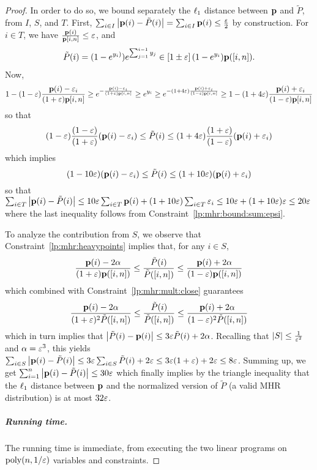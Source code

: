 \begin{proof}
In order to do so, we bound separately the $\lp[1]$ distance between $\D$ and $\tilde{P}$, from $I$, $S$, and $T$. 
First, $\sum_{i\in I} \abs{\D(i) - \tilde{P}(i)}  = \sum_{i\in I} \D(i) \leq \frac{\eps}{2}$ by construction.
For $i\in T$, we have $\frac{\D(i)}{\D[i,n]} \leq \eps$, and
\begin{align*}
  \tilde{P}(i) = (1-e^{y_i)}) e^{\sum_{j=1}^{i-1} y_j} \in \left[1\pm \eps\right] (1-e^{y_i}) \D([i,n]).
\end{align*}
Now,
\begin{align*}
  1-(1-\eps)\frac{\D(i)-\eps_i}{(1+\eps)\D[i,n]} \geq e^{-\frac{\D(i)-\eps_i}{(1+\eps)\D[i,n]}} 
  \geq e^{y_i} 
  \geq e^{-(1+4\eps)\frac{\D(i)+\eps_i}{(1-\eps)\D[i,n]}} 
  \geq 1-(1+4\eps)\frac{\D(i)+\eps_i}{(1-\eps)\D[i,n]}
\end{align*}
so that
\[
  (1-\eps)\frac{(1-\eps)}{(1+\eps)}(\D(i)-\eps_i)
  \leq
  \tilde{P}(i) 
  \leq
  (1+4\eps)\frac{(1+\eps)}{(1-\eps)}(\D(i)+\eps_i)
\]
which implies
\[
  (1-10\eps)(\D(i)-\eps_i)
  \leq
  \tilde{P}(i) 
  \leq
  (1+10\eps)(\D(i)+\eps_i)
\]
so that $\sum_{i\in T} \abs{\D(i) - \tilde{P}(i)} \leq 10\eps \sum_{i\in T} \D(i) + (1+10\eps)\sum_{i\in T} \eps_i \leq 10\eps + (1+10\eps)\eps \leq 20\eps$
where the last inequality follows from Constraint~\eqref{lp:mhr:bound:sum:epsi}.

To analyze the contribution from $S$, we observe that Constraint~\eqref{lp:mhr:heavypoints} implies that, for any $i\in S$,
\[
    \frac{\D(i)-2\alpha}{(1+\eps)\D([i,n])} \leq \frac{\tilde{P}(i)}{\tilde{P}([i,n])} \leq \frac{\D(i)+2\alpha}{(1-\eps)\D([i,n])}
\]
which combined with Constraint~\eqref{lp:mhr:mult:close} guarantees
\[
    \frac{\D(i)-2\alpha}{(1+\eps)^2\tilde{P}([i,n])} \leq \frac{\tilde{P}(i)}{\tilde{P}([i,n])} \leq \frac{\D(i)+2\alpha}{(1-\eps)^2\tilde{P}([i,n])}
\]
which in turn implies that $\abs{\tilde{P}(i) - \D(i) } \leq 3\eps\tilde{P}(i) + 2\alpha$. Recalling that $\abs{S} \leq \frac{1}{\eps^2}$ and $\alpha=\eps^3$, this yields
$\sum_{i\in S} \abs{\D(i) - \tilde{P}(i)} \leq 3\eps \sum_{i\in S}  \tilde{P}(i)  + 2\eps \leq 3\eps(1+\eps) + 2\eps \leq 8\eps$. Summing up, we get
$
  \sum_{i=1}^n \abs{\D(i) - \tilde{P}(i)} \leq 30\eps
$
which finally implies by the triangle inequality that the $\lp[1]$ distance between $\D$ and the normalized version of $\tilde{P}$ (a valid MHR distribution) is at most $32\eps$.

\subparagraph{Running time.} The running time is immediate, from executing the two linear programs on $\poly(n,1/\eps)$ variables and constraints.
\end{proof}


